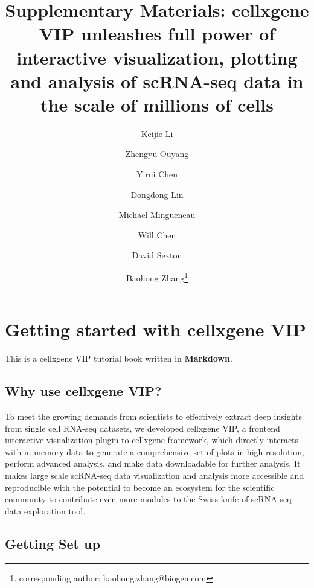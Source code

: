 \documentclass[
]{article}
\author{}
\date{\vspace{-2.5em}}
\begin{document}
\def\instnum{}
\author[1]{Keijie Li}
\author[2]{Zhengyu Ouyang}
\author[1]{Yirui Chen}
\author[1]{Dongdong Lin}
\author[1]{Michael Mingueneau}
\author[1]{Will Chen}
\author[1]{David Sexton}
\author[1]{Baohong Zhang\thanks{corresponding author: baohong.zhang@biogen.com}}
                                           
\title{\textbf{Supplementary Materials}: cellxgene VIP unleashes full power of interactive visualization, plotting and analysis of scRNA-seq data in the scale of millions of cells}

\maketitle


{
\setcounter{tocdepth}{4}
\tableofcontents
}
\hypertarget{getting-started-with-cellxgene-vip}{%
\section{Getting started with cellxgene VIP}\label{getting-started-with-cellxgene-vip}}

This is a cellxgene VIP tutorial book written in \textbf{Markdown}.

\hypertarget{why-use-cellxgene-vip}{%
\subsection{Why use cellxgene VIP?}\label{why-use-cellxgene-vip}}

To meet the growing demands from scientists to effectively extract deep insights from single cell RNA-seq datasets, we developed cellxgene VIP, a frontend interactive visualization plugin to cellxgene framework, which directly interacts with in-memory data to generate a comprehensive set of plots in high resolution, perform advanced analysis, and make data downloadable for further analysis. It makes large scale scRNA-seq data visualization and analysis more accessible and reproducible with the potential to become an ecosystem for the scientific community to contribute even more modules to the Swiss knife of scRNA-seq data exploration tool.

\hypertarget{getting-set-up}{%
\subsection{Getting Set up}\label{getting-set-up}}
\end{document}
